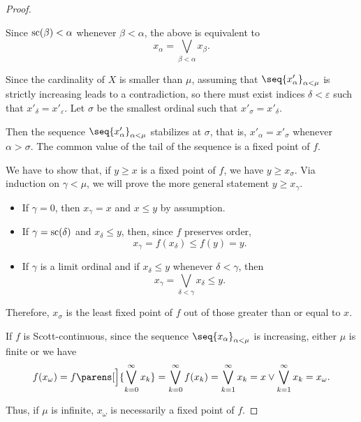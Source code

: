 \begin{proof}
\begin{itemize}
    Since \( \op{sc}(\beta) < \alpha \) whenever \( \beta < \alpha \), the above is equivalent to
    \begin{equation*}
      x_\alpha = \bigvee_{\beta < \alpha} x_\beta.
    \end{equation*}
  \end{itemize}

   Since the cardinality of \( X \) is smaller than \( \mu \), assuming that \( \seq{ x'_\alpha }_{\alpha < \mu} \) is strictly increasing leads to a contradiction, so there must exist indices \( \delta < \varepsilon \) such that \( x'_\delta = x'_\varepsilon \). Let \( \sigma \) be the smallest ordinal such that \( x'_\sigma = x'_\delta \).

  Then the sequence \( \seq{ x'_\alpha }_{\alpha < \mu} \) stabilizes at \( \sigma \), that is, \( x'_\alpha = x'_\sigma \) whenever \( \alpha > \sigma \). The common value of the tail of the sequence is a fixed point of \( f \).

   We have to show that, if \( y \geq x \) is a fixed point of \( f \), we have \( y \geq x_\sigma \). Via induction on \( \gamma < \mu \), we will prove the more general statement \( y \geq x_\gamma \).
  \begin{itemize}
    \item If \( \gamma = 0 \), then \( x_\gamma = x \) and \( x \leq y \) by assumption.
    \item If \( \gamma = \op{sc}(\delta) \) and  \( x_\delta \leq y \), then, since \( f \) preserves order,
    \begin{equation*}
      x_\gamma = f(x_\delta) \leq f(y) = y.
    \end{equation*}

    \item If \( \gamma \) is a limit ordinal and if \( x_\delta \leq y \) whenever \( \delta < \gamma \), then
    \begin{equation*}
      x_\gamma = \bigvee_{\delta < \gamma} x_\delta \leq y.
    \end{equation*}
  \end{itemize}

  Therefore, \( x_\sigma \) is the least fixed point of \( f \) out of those greater than or equal to \( x \).

   If \( f \) is Scott-continuous, since the sequence \( \seq{ x_\alpha }_{\alpha < \mu} \) is increasing, either \( \mu \) is finite or we have
  \begin{equation*}
    f(x_\omega)
    =
    f\parens[\Big]{ \bigvee_{k=0}^\infty x_k }
    =
    \bigvee_{k=0}^\infty f(x_k)
    =
    \bigvee_{k=1}^\infty x_k
    =
    x \vee \bigvee_{k=1}^\infty x_k
    =
    x_\omega.
  \end{equation*}

  Thus, if \( \mu \) is infinite, \( x_\omega \) is necessarily a fixed point of \( f \).
\end{proof}

